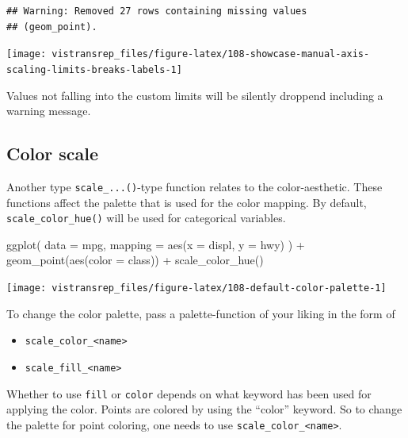 \documentclass[]{book}
\newenvironment{Shaded}{}{}
\newcommand{\DataTypeTok}[1]{#1}
\newcommand{\KeywordTok}[1]{\textcolor[rgb]{0.00,0.00,1.00}{#1}}
\newcommand{\NormalTok}[1]{#1}
\newcommand{\OperatorTok}[1]{#1}
\newcommand{\StringTok}[1]{\textcolor[rgb]{0.00,0.50,0.50}{#1}}
\providecommand{\tightlist}{%
  \setlength{\itemsep}{0pt}\setlength{\parskip}{0pt}}
\begin{document}
\begin{verbatim}
## Warning: Removed 27 rows containing missing values
## (geom_point).
\end{verbatim}

\begin{flushright}\texttt{[image: vistransrep\_files/figure-latex/108-showcase-manual-axis-scaling-limits-breaks-labels-1]} \end{flushright}

Values not falling into the custom limits will be silently droppend including a warning message.

\hypertarget{color-scale}{%
\subsection{Color scale}\label{color-scale}}

Another type \texttt{scale\_...()}-type function relates to the color-aesthetic.
These functions affect the palette that is used for the color mapping.
By default, \texttt{scale\_color\_hue()} will be used for categorical variables.

\begin{Shaded}
\begin{Highlighting}[]
\KeywordTok{ggplot}\NormalTok{(}
  \DataTypeTok{data =}\NormalTok{ mpg,}
  \DataTypeTok{mapping =} \KeywordTok{aes}\NormalTok{(}\DataTypeTok{x =}\NormalTok{ displ, }\DataTypeTok{y =}\NormalTok{ hwy)}
\NormalTok{) }\OperatorTok{+}
\StringTok{  }\KeywordTok{geom_point}\NormalTok{(}\KeywordTok{aes}\NormalTok{(}\DataTypeTok{color =}\NormalTok{ class)) }\OperatorTok{+}
\StringTok{  }\KeywordTok{scale_color_hue}\NormalTok{()}
\end{Highlighting}
\end{Shaded}

\begin{flushright}\texttt{[image: vistransrep\_files/figure-latex/108-default-color-palette-1]} \end{flushright}

To change the color palette, pass a palette-function of your liking in the form of

\begin{itemize}
\tightlist
\item
  \texttt{scale\_color\_\textless{}name\textgreater{}}
\item
  \texttt{scale\_fill\_\textless{}name\textgreater{}}
\end{itemize}

Whether to use \texttt{fill} or \texttt{color} depends on what keyword has been used for applying the color.
Points are colored by using the ``color'' keyword.
So to change the palette for point coloring, one needs to use \texttt{scale\_color\_\textless{}name\textgreater{}}.
\end{document}
